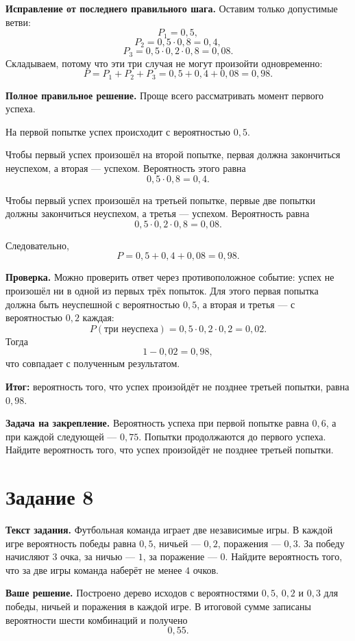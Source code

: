 \documentclass[12pt,a4paper]{article}
\begin{document}
\textbf{Исправление от последнего правильного шага.}
Оставим только допустимые ветви:
\[
P_1=0{,}5,
\]
\[
P_2=0{,}5\cdot 0{,}8=0{,}4,
\]
\[
P_3=0{,}5\cdot 0{,}2\cdot 0{,}8=0{,}08.
\]
Складываем, потому что эти три случая не могут произойти одновременно:
\[
P=P_1+P_2+P_3=0{,}5+0{,}4+0{,}08=0{,}98.
\]

\textbf{Полное правильное решение.}
Проще всего рассматривать момент первого успеха.

На первой попытке успех происходит с вероятностью $0{,}5$.

Чтобы первый успех произошёл на второй попытке, первая должна закончиться неуспехом, а вторая --- успехом. Вероятность этого равна
\[
0{,}5\cdot 0{,}8=0{,}4.
\]

Чтобы первый успех произошёл на третьей попытке, первые две попытки должны закончиться неуспехом, а третья --- успехом. Вероятность равна
\[
0{,}5\cdot 0{,}2\cdot 0{,}8=0{,}08.
\]

Следовательно,
\[
P=0{,}5+0{,}4+0{,}08=0{,}98.
\]

\textbf{Проверка.}
Можно проверить ответ через противоположное событие: успех не произошёл ни в одной из первых трёх попыток. Для этого первая попытка должна быть неуспешной с вероятностью $0{,}5$, а вторая и третья --- с вероятностью $0{,}2$ каждая:
\[
P(\text{три неуспеха})=0{,}5\cdot0{,}2\cdot0{,}2=0{,}02.
\]
Тогда
\[
1-0{,}02=0{,}98,
\]
что совпадает с полученным результатом.

\textcolor{teal!60!black}{\textbf{Итог:}} вероятность того, что успех произойдёт не позднее третьей попытки, равна $0{,}98$.

\textbf{Задача на закрепление.}
Вероятность успеха при первой попытке равна $0{,}6$, а при каждой следующей --- $0{,}75$. Попытки продолжаются до первого успеха. Найдите вероятность того, что успех произойдёт не позднее третьей попытки.

\newpage
{}\label{task:8}
\section*{Задание 8}

\textbf{Текст задания.}
Футбольная команда играет две независимые игры. В каждой игре вероятность победы равна $0{,}5$, ничьей --- $0{,}2$, поражения --- $0{,}3$. За победу начисляют $3$ очка, за ничью --- $1$, за поражение --- $0$. Найдите вероятность того, что за две игры команда наберёт не менее $4$ очков.

\textbf{Ваше решение.}
Построено дерево исходов с вероятностями $0{,}5$, $0{,}2$ и $0{,}3$ для победы, ничьей и поражения в каждой игре. В итоговой сумме записаны вероятности шести комбинаций и получено
\[
0{,}55.
\]
\end{document}

